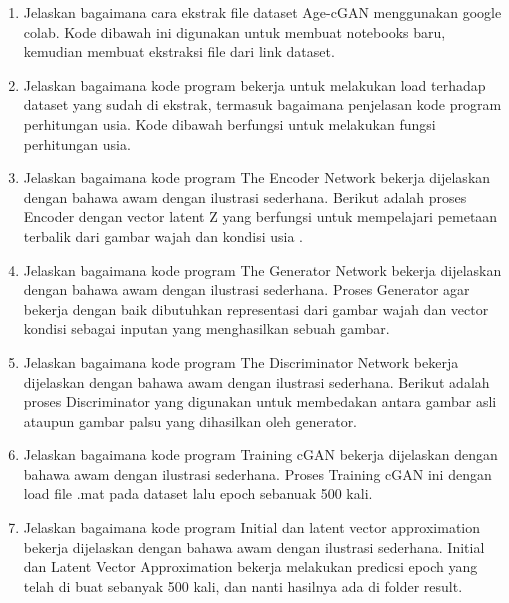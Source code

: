    \begin{enumerate}
	\item Jelaskan bagaimana cara ekstrak ﬁle dataset Age-cGAN menggunakan google colab.
    Kode dibawah ini digunakan untuk membuat notebooks baru, kemudian membuat ekstraksi file dari link dataset.
	

	\item Jelaskan bagaimana kode program bekerja untuk melakukan load terhadap dataset yang sudah di ekstrak, termasuk bagaimana penjelasan kode program perhitungan usia.
    Kode dibawah berfungsi untuk melakukan fungsi perhitungan usia.
	

	\item Jelaskan bagaimana kode program The Encoder Network bekerja dijelaskan dengan bahawa awam dengan ilustrasi sederhana.
    Berikut adalah proses Encoder dengan vector latent Z yang berfungsi untuk mempelajari pemetaan terbalik dari gambar wajah dan kondisi usia .
	

	\item Jelaskan bagaimana kode program The Generator Network bekerja dijelaskan dengan bahawa awam dengan ilustrasi sederhana.
    Proses Generator agar bekerja dengan baik dibutuhkan representasi dari gambar wajah dan vector kondisi sebagai inputan yang menghasilkan sebuah gambar.
	

    \item Jelaskan bagaimana kode program The Discriminator Network bekerja dijelaskan dengan bahawa awam dengan ilustrasi sederhana.
    Berikut adalah proses Discriminator yang digunakan untuk membedakan antara gambar asli ataupun gambar palsu yang dihasilkan oleh generator.
	

    \item Jelaskan bagaimana kode program Training cGAN bekerja dijelaskan dengan bahawa awam dengan ilustrasi sederhana.
    Proses Training cGAN ini dengan load file .mat pada dataset lalu epoch sebanuak 500 kali.

	

    \item Jelaskan bagaimana kode program Initial dan latent vector approximation bekerja dijelaskan dengan bahawa awam dengan ilustrasi sederhana.
    Initial dan Latent Vector Approximation bekerja melakukan predicsi epoch yang telah di buat sebanyak 500 kali, dan nanti hasilnya ada di folder result.

	

\end{enumerate}